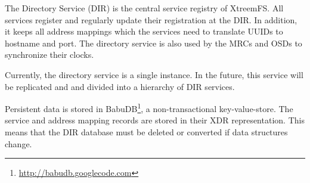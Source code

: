 The Directory Service (DIR) is the central service registry of XtreemFS. All services register and regularly update their registration at the DIR. In addition, it keeps all address mappings which the services need to translate UUIDs to hostname and port. The directory service is also used by the MRCs and OSDs to synchronize their clocks.

Currently, the directory service is a single instance. In the future, this service will be replicated and and divided into a hierarchy of DIR services.

Persistent data is stored in BabuDB\footnote{\url{http://babudb.googlecode.com}}, a non-transactional key-value-store. The service and address mapping records are stored in their XDR representation. This means that the DIR database must be deleted or converted if data structures change.